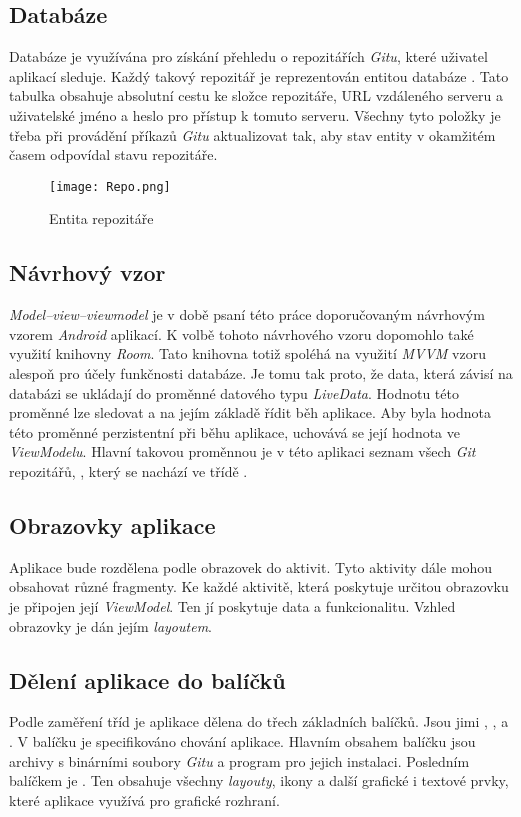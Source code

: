     \newpage
    \subsection{Databáze}
    Databáze je využívána pro získání přehledu o repozitářích \emph{Gitu}, které uživatel aplikací sleduje. Každý takový repozitář je reprezentován entitou databáze . Tato tabulka obsahuje absolutní cestu ke složce repozitáře, URL vzdáleného serveru a uživatelské jméno a heslo pro přístup k tomuto serveru. Všechny tyto položky je třeba při provádění příkazů \emph{Gitu} aktualizovat tak, aby stav entity v okamžitém časem odpovídal stavu repozitáře.

    \begin{figure}[h!]
        \centering
        \vspace{0.5cm}
        \texttt{[image: Repo.png]}
        \caption{Entita repozitáře}
        \label{RepoTable}
    \end{figure}

    \subsection{Návrhový vzor}
    \emph{Model–view–viewmodel} je v době psaní této práce doporučovaným návrhovým vzorem \emph{Android} aplikací. K volbě tohoto návrhového vzoru dopomohlo také využití knihovny \emph{Room}. Tato knihovna totiž spoléhá na využití \emph{MVVM} vzoru alespoň pro účely funkčnosti databáze. Je tomu tak proto, že data, která závisí na databázi se ukládají do proměnné datového typu \emph{LiveData}. Hodnotu této proměnné lze sledovat a na jejím základě řídit běh aplikace. Aby byla hodnota této proměnné perzistentní při běhu aplikace, uchovává se její hodnota ve \emph{ViewModelu}. Hlavní takovou proměnnou je v této aplikaci seznam všech \emph{Git} repozitářů, , který se nachází ve třídě .
    
    \subsection{Obrazovky aplikace}
    Aplikace bude rozdělena podle obrazovek do aktivit. Tyto aktivity dále mohou obsahovat různé fragmenty. Ke každé aktivitě, která poskytuje určitou obrazovku je připojen její \emph{ViewModel}. Ten jí poskytuje data a funkcionalitu. Vzhled obrazovky je dán jejím \emph{layoutem}.

    \newpage
    \subsection{Dělení aplikace do balíčků}
    Podle zaměření tříd je aplikace dělena do třech základních balíčků. Jsou jimi , , a . V balíčku  je specifikováno chování aplikace. Hlavním obsahem balíčku  jsou archivy s binárními soubory \emph{Gitu} a program  pro jejich instalaci. Posledním balíčkem je . Ten obsahuje všechny \emph{layouty}, ikony a další grafické i textové prvky, které aplikace využívá pro grafické rozhraní.

